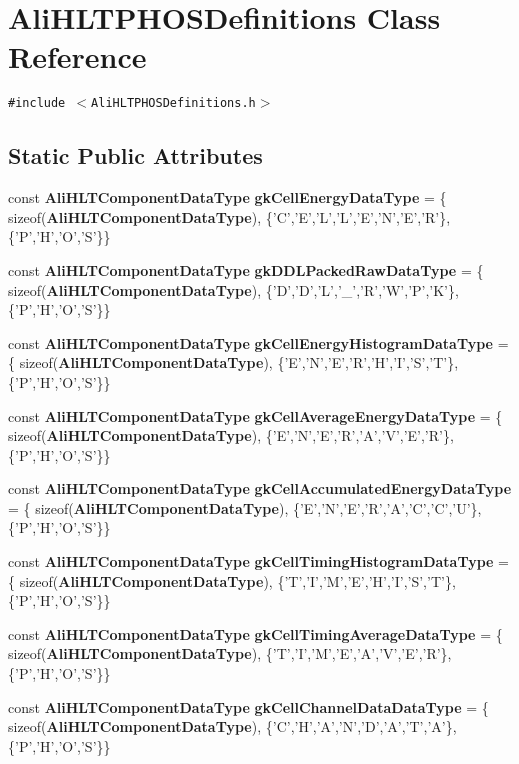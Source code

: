 \section{Ali\-HLTPHOSDefinitions Class Reference}
\label{classAliHLTPHOSDefinitions}
{\tt \#include $<$Ali\-HLTPHOSDefinitions.h$>$}

\subsection*{Static Public Attributes}
\begin{CompactItemize}
\item 
const {\bf Ali\-HLTComponent\-Data\-Type} {\bf gk\-Cell\-Energy\-Data\-Type} = \{ sizeof({\bf Ali\-HLTComponent\-Data\-Type}), \{'C','E','L','L','E','N','E','R'\},\{'P','H','O','S'\}\}
\item 
const {\bf Ali\-HLTComponent\-Data\-Type} {\bf gk\-DDLPacked\-Raw\-Data\-Type} = \{ sizeof({\bf Ali\-HLTComponent\-Data\-Type}), \{'D','D','L','\_\-','R','W','P','K'\},\{'P','H','O','S'\}\}
\item 
const {\bf Ali\-HLTComponent\-Data\-Type} {\bf gk\-Cell\-Energy\-Histogram\-Data\-Type} = \{ sizeof({\bf Ali\-HLTComponent\-Data\-Type}), \{'E','N','E','R','H','I','S','T'\},\{'P','H','O','S'\}\}
\item 
const {\bf Ali\-HLTComponent\-Data\-Type} {\bf gk\-Cell\-Average\-Energy\-Data\-Type} = \{ sizeof({\bf Ali\-HLTComponent\-Data\-Type}), \{'E','N','E','R','A','V','E','R'\},\{'P','H','O','S'\}\}
\item 
const {\bf Ali\-HLTComponent\-Data\-Type} {\bf gk\-Cell\-Accumulated\-Energy\-Data\-Type} = \{ sizeof({\bf Ali\-HLTComponent\-Data\-Type}), \{'E','N','E','R','A','C','C','U'\},\{'P','H','O','S'\}\}
\item 
const {\bf Ali\-HLTComponent\-Data\-Type} {\bf gk\-Cell\-Timing\-Histogram\-Data\-Type} = \{ sizeof({\bf Ali\-HLTComponent\-Data\-Type}), \{'T','I','M','E','H','I','S','T'\},\{'P','H','O','S'\}\}
\item 
const {\bf Ali\-HLTComponent\-Data\-Type} {\bf gk\-Cell\-Timing\-Average\-Data\-Type} = \{ sizeof({\bf Ali\-HLTComponent\-Data\-Type}), \{'T','I','M','E','A','V','E','R'\},\{'P','H','O','S'\}\}
\item 
const {\bf Ali\-HLTComponent\-Data\-Type} {\bf gk\-Cell\-Channel\-Data\-Data\-Type} = \{ sizeof({\bf Ali\-HLTComponent\-Data\-Type}), \{'C','H','A','N','D','A','T','A'\},\{'P','H','O','S'\}\}
\end{CompactItemize}


